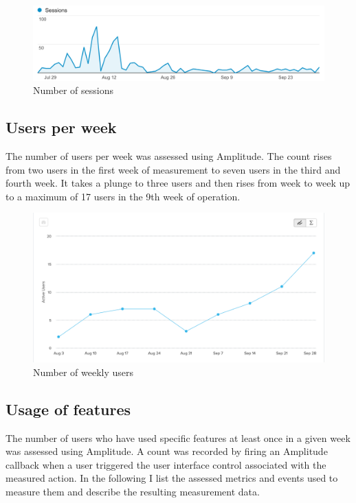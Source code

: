 \begin{figure}[htbp]
\centering
\includegraphics{img/eval_sessions.png}
\caption{Number of sessions}
\end{figure}

\subsection{Users per week}\label{users-per-week}

The number of users per week was assessed using Amplitude. The count
rises from two users in the first week of measurement to seven users in
the third and fourth week. It takes a plunge to three users and then
rises from week to week up to a maximum of 17 users in the 9th week of
operation.

\begin{figure}[htbp]
\centering
\includegraphics{img/eval_weekly_users.png}
\caption{Number of weekly users}
\end{figure}

\subsection{Usage of features}\label{usage-of-features}

The number of users who have used specific features at least once in a
given week was assessed using Amplitude. A count was recorded by firing
an Amplitude callback when a user triggered the user interface control
associated with the measured action. In the following I list the
assessed metrics and events used to measure them and describe the
resulting measurement data.

